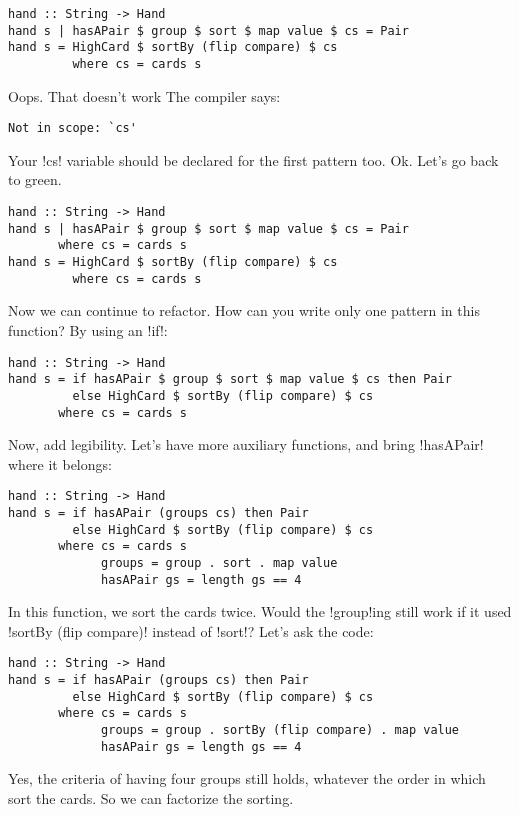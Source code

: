 \begin{lstlisting}[frame=single]
hand :: String -> Hand
hand s | hasAPair $ group $ sort $ map value $ cs = Pair
hand s = HighCard $ sortBy (flip compare) $ cs
         where cs = cards s
\end{lstlisting}   
\failure Oops. That doesn't work
\lhN The compiler says:
\begin{small}
\begin{verbatim}
Not in scope: `cs'
\end{verbatim}
\end{small}
Your \il!cs! variable should be declared for the first pattern too.
\lhA Ok. Let's go back to green.
\begin{lstlisting}[frame=single]
hand :: String -> Hand
hand s | hasAPair $ group $ sort $ map value $ cs = Pair
       where cs = cards s
hand s = HighCard $ sortBy (flip compare) $ cs
         where cs = cards s
\end{lstlisting}
\success Now we can continue to refactor.
\lhN How can you write only one pattern in this function?
\lhA \success By using an \il!if!:
\begin{lstlisting}[frame=single]
hand :: String -> Hand
hand s = if hasAPair $ group $ sort $ map value $ cs then Pair
         else HighCard $ sortBy (flip compare) $ cs
       where cs = cards s
\end{lstlisting}
\lhN Now, add legibility.
\lhA \success Let's have more auxiliary functions, and bring \il!hasAPair! where it belongs:
\begin{lstlisting}[frame=single]
hand :: String -> Hand
hand s = if hasAPair (groups cs) then Pair
         else HighCard $ sortBy (flip compare) $ cs
       where cs = cards s
             groups = group . sort . map value
             hasAPair gs = length gs == 4 
\end{lstlisting}
\lhN In this function, we sort the cards twice. Would the \il!group!ing still work if it used \il!sortBy (flip compare)! instead of \il!sort!?
\lhA \success Let's ask the code:
\begin{lstlisting}[frame=single]
hand :: String -> Hand
hand s = if hasAPair (groups cs) then Pair
         else HighCard $ sortBy (flip compare) $ cs
       where cs = cards s
             groups = group . sortBy (flip compare) . map value
             hasAPair gs = length gs == 4 
\end{lstlisting}
\success Yes, the criteria of having four groups still holds, whatever the order in which sort the cards.
\lhN So we can factorize the sorting.
